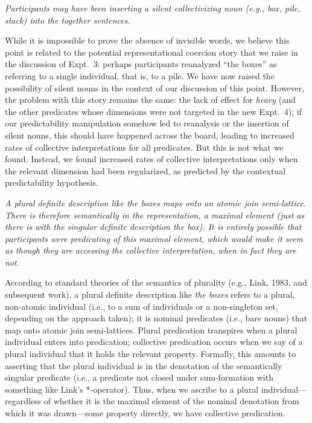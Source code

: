 \documentclass[12pt]{article}
\begin{document}
\item \emph{Participants may have been inserting a silent collectivizing noun (e.g., \emph{box}, \emph{pile}, \emph{stack}) into the \emph{together} sentences.}

While it is impossible to prove the absence of invisible words, we believe this point is related to the potential representational coercion story that we raise in the discussion of Expt.~3: perhaps participants reanalyzed ``the boxes'' as referring to a single individual, that is, to a pile. We have now raised the possibility of silent nouns in the context of our discussion of this point. However, the problem with this story remains the same: the lack of effect for \emph{heavy} (and the other predicates whose dimensions were not targeted in the new Expt.~4); if our predictability manipulation somehow led to reanalysis or the insertion of silent nouns, this should have happened across the board, leading to increased rates of collective interpretations for all predicates. But this is not what we found. Instead, we found increased rates of collective interpretations only when the relevant dimension had been regularized, as predicted by the contextual predictability hypothesis.

\item \emph{A plural definite description like \emph{the boxes} maps onto an atomic join semi-lattice. There is therefore semantically in the representation, a maximal element (just as there is with the singular definite description \emph{the box}). It is entirely possible that participants were predicating of this maximal element, which would make it seem as though they are accessing the collective interpretation, when in fact they are not.}

According to standard theories of the semantics of plurality (e.g., Link, 1983, and subsequent work), a plural definite description like \emph{the boxes} refers to a plural, non-atomic individual (i.e., to a sum of individuals or a non-singleton set, depending on the approach taken); it is nominal predicates (i.e., bare nouns) that map onto atomic join semi-lattices. Plural predication transpires when a plural individual enters into predication; collective predication occurs when we say of a plural individual that it holds the relevant property. Formally, this amounts to asserting that the plural individual is in the denotation of the semantically singular predicate (i.e., a predicate not closed under sum-formation with something like Link's *-operator). Thus, when we ascribe to a plural individual---regardless of whether it is the maximal element of the nominal denotation from which it was drawn---some property directly, we have collective predication.
\end{document}
